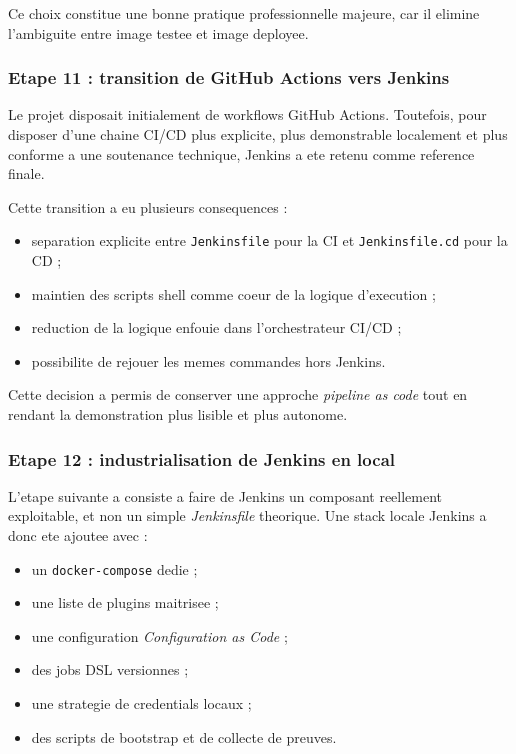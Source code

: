 Ce choix constitue une bonne pratique professionnelle majeure, car il elimine l'ambiguite entre image testee et image deployee.

\subsubsection{Etape 11 : transition de GitHub Actions vers Jenkins}

Le projet disposait initialement de workflows GitHub Actions. Toutefois, pour disposer d'une chaine CI/CD plus explicite, plus demonstrable localement et plus conforme a une soutenance technique, Jenkins a ete retenu comme reference finale.

Cette transition a eu plusieurs consequences :

\begin{itemize}
  \item separation explicite entre \texttt{Jenkinsfile} pour la CI et \texttt{Jenkinsfile.cd} pour la CD ;
  \item maintien des scripts shell comme coeur de la logique d'execution ;
  \item reduction de la logique enfouie dans l'orchestrateur CI/CD ;
  \item possibilite de rejouer les memes commandes hors Jenkins.
\end{itemize}

Cette decision a permis de conserver une approche \textit{pipeline as code} tout en rendant la demonstration plus lisible et plus autonome.

\subsubsection{Etape 12 : industrialisation de Jenkins en local}

L'etape suivante a consiste a faire de Jenkins un composant reellement exploitable, et non un simple \textit{Jenkinsfile} theorique. Une stack locale Jenkins a donc ete ajoutee avec :

\begin{itemize}
  \item un \texttt{docker-compose} dedie ;
  \item une liste de plugins maitrisee ;
  \item une configuration \textit{Configuration as Code} ;
  \item des jobs DSL versionnes ;
  \item une strategie de credentials locaux ;
  \item des scripts de bootstrap et de collecte de preuves.
\end{itemize}

